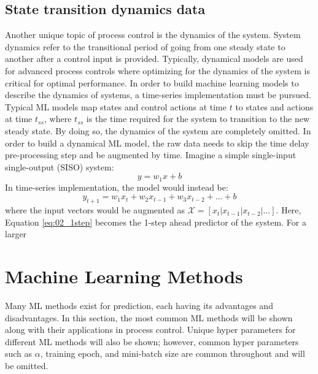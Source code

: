 \subsection{State transition dynamics data}
Another unique topic of process control is the dynamics of the system. System dynamics refer to the transitional period of going from one steady state to another after a control input is provided. Typically, dynamical models are used for advanced process controls where optimizing for the dynamics of the system is critical for optimal performance.  In order to build machine learning models to describe the dynamics of systems, a time-series implementation must be pursued.  Typical ML models map states and control actions at time $t$ to states and actions at time $t_{ss}$, where $t_{ss}$ is the time required for the system to transition to the new steady state.  By doing so, the dynamics of the system are completely omitted.  In order to build a dynamical ML model, the raw data needs to skip the time delay pre-processing step and be augmented by time.  Imagine a simple single-input single-output (SISO) system:
\begin{equation}
    y = w_1x + b
\end{equation}
In time-series implementation, the model would instead be:
\begin{equation}
    y_{t + 1} = w_1x_{t} + w_2x_{t - 1} + w_3x_{t - 2} + ... + b
    \label{eq:02_1step}
\end{equation}
where the input vectors would be augmented as $\mathcal{X} = [x_{t} | x_{t - 1} | x_{t - 2} | ... ]$. Here, Equation \ref{eq:02_1step} becomes the 1-step ahead predictor of the system.  For a larger 

\section{Machine Learning Methods}

Many ML methods exist for prediction, each having its advantages and disadvantages. In this section, the most common ML methods will be shown along with their applications in process control.  Unique hyper parameters for different ML methods will also be shown; however, common hyper parameters such as $\alpha$, training epoch, and mini-batch size are common throughout and will be omitted.

